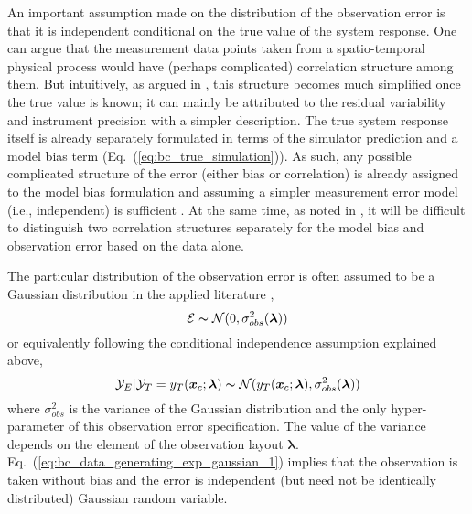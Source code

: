 An important assumption made on the distribution of the observation error is that it is independent conditional on the true value of the system response.
One can argue that the measurement data points taken from a spatio-temporal physical process would have (perhaps complicated) correlation structure among them.
But intuitively, as argued in \cite{Wikle2001}, this structure becomes much simplified once the true value is known;
it can mainly be attributed to the residual variability and instrument precision with a simpler description.
The true system response itself is already separately formulated in terms of the simulator prediction and a model bias term (Eq.~(\ref{eq:bc_true_simulation})).
As such, any possible complicated structure of the error (either bias or correlation) is already assigned to the model bias formulation and assuming a simpler measurement error model (i.e., independent) is sufficient \cite{Wikle2001}.
At the same time, as noted in \cite{Kennedy2001,Bayarri2007}, it will be difficult to distinguish two correlation structures separately for the model bias and observation error based on the data alone.

The particular distribution of the observation error is often assumed to be a Gaussian distribution in the
applied literature \cite{Wikle1998,Wikle2001,Kennedy2001,Bayarri2007,Arhonditsis2008},
\begin{equation}
        \mathcal{E} \thicksim \mathcal{N}(0, \sigma_{obs}^2(\bm{\lambda}))
\label{eq:bc_data_generating_exp_gaussian_1}
\end{equation}
or equivalently following the conditional independence assumption explained above,
\begin{equation}
  \mathcal{Y}_E | \mathcal{Y}_T = y_T(\bm{x}_c; \boldsymbol{\lambda}) \thicksim \mathcal{N}(y_T(\bm{x}_c; \boldsymbol{\lambda}), \sigma_{obs}^2(\bm{\lambda}))
\label{eq:bc_data_generating_exp_gaussian_2}
\end{equation}
where $\sigma_{obs}^2$ is the variance of the Gaussian distribution and the only hyper-parameter of this observation error specification.
The value of the variance depends on the element of the observation layout $\bm{\lambda}$.
Eq.~(\ref{eq:bc_data_generating_exp_gaussian_1}) implies that the observation is taken without bias and the error is independent (but need not be identically distributed) Gaussian random variable.

